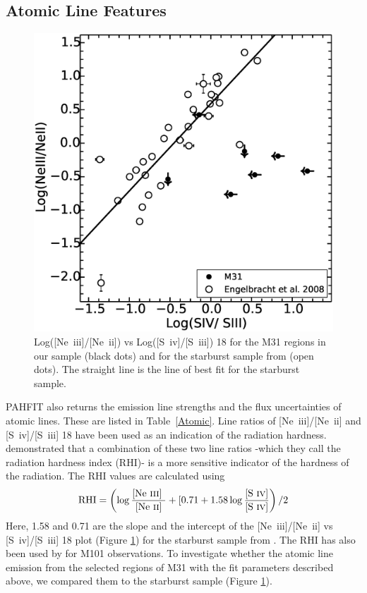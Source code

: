 \subsection{Atomic Line Features}
\begin{figure}

\centering
\includegraphics[scale=0.3]{./NevsS.eps}
\caption{ Log([Ne~{\sc iii}]/[Ne~{\sc ii}])  vs Log([S~{\sc iv}]/[S~{\sc iii}]) 18 for the M31 regions in our sample (black dots) and for the starburst sample from \citet{Engelbracht_2008} (open dots). The straight line is the line of best fit for the starburst sample.}
\label{SvsNe}
\end{figure}

PAHFIT also returns the emission line strengths and the flux uncertainties of atomic lines. These are listed in Table~\ref{Atomic}.
Line ratios of [Ne~{\sc iii}]/[Ne~{\sc ii}] and [S~{\sc iv}]/[S~{\sc iii}] 18 have been used as an indication of the radiation hardness. \citet{Engelbracht_2008} demonstrated that a combination of these two line ratios -which they call the radiation hardness index (RHI)- is a more sensitive indicator of the hardness of the radiation. The RHI values are calculated using
\begin{equation}
{\rm RHI} = \left( \log\frac{\textrm{[Ne~{\sc iii}] }}{\textrm{[Ne~{\sc ii}]}} + [0.71 + 1.58\log\frac{\textrm{{[S~{\sc iv}]}}}{\textrm{{[S~{\sc iv}]}}}\right) /2
\end{equation}
Here, 1.58 and 0.71 are the slope and the intercept of the [Ne~{\sc iii}]/[Ne~{\sc ii}]  vs [S~{\sc iv}]/[S~{\sc iii}] 18 plot (Figure \ref{SvsNe}) for the starburst sample from 
\citet{Engelbracht_2008}. The RHI has also been used by \citet{Gordon:2008lr} for M101 observations. To investigate whether the atomic line emission from the selected regions of M31 with the fit parameters described above, we compared them to the starburst sample (Figure \ref{SvsNe}). 
	
